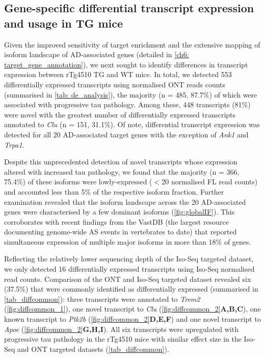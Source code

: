 \newpage
\subsection{Gene-specific differential transcript expression and usage in TG mice}
Given the improved sensitivity of target enrichment and the extensive mapping of isoform landscape of AD-associated genes (detailed in \cref{ch6: target_gene_annotation}), we next sought to identify differences in transcript expression between rTg4510 TG and WT mice. In total, we detected 553 differentially expressed transcripts using normalised ONT reads counts (summarised in \cref{tab: de_analysis}), the majority (n = 485, 87.7\%) of which were associated with progressive tau pathology. Among these, 448 transcripts (81\%) were novel with the greatest number of differentially expressed transcripts annotated to \textit{Clu} (n = 151, 31.1\%). Of note, differential transcript expression was detected for all 20 AD-associated target genes with the exception of \textit{Ank1} and \textit{Trpa1}. 

Despite this unprecedented detection of novel transcripts whose expression altered with increased tau pathology, we found that the majority (n = 366, 75.4\%) of these isoforms were lowly-expressed ($<$20 normalised FL read counts) and accounted less than 5\% of the respective isoform fraction. Further examination revealed that the isoform landscape across the 20 AD-associated genes were characterised by a few dominant isoforms (\cref{fig:globalIF}). This corroborates with recent findings from the VastDB\cite{Tapial2017} (the largest resource documenting genome-wide AS events in vertebrates to date) that reported simultaneous expression of multiple major isoforms in more than 18\% of genes\cite{Tapial2017}. 

Reflecting the relatively lower sequencing depth of the Iso-Seq targeted dataset, we only detected 16 differentially expressed transcripts using Iso-Seq normalised read counts. Comparison of the ONT and Iso-Seq targeted dataset revealed six (37.5\%) that were commonly identified as differentially expressed (summarised in \cref{tab_diffcommon}): three transcripts were annotated to \textit{Trem2} (\cref{fig:diffcommon_1}), one novel transcript to \textit{Clu} (\cref{fig:diffcommon_2}\textbf{A,B,C}), one known transcript to \textit{Ptk2b} (\cref{fig:diffcommon_2}\textbf{D,E,F}) and one novel transcript to \textit{Apoe} (\cref{fig:diffcommon_2}\textbf{G,H,I}). All six transcripts were upregulated with progressive tau pathology in the rTg4510 mice with similar effect size in the Iso-Seq and ONT targeted datasets (\cref{tab_diffcommon}).  

